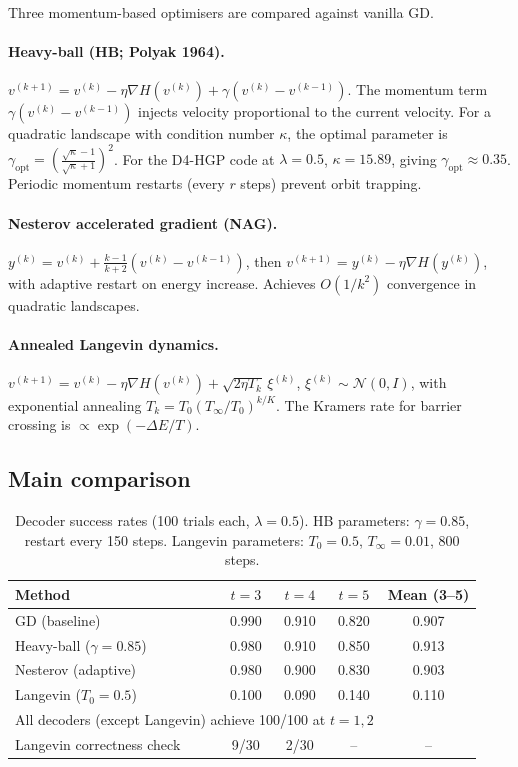 \documentclass[12pt,a4paper]{article}
\theoremstyle{plain}
\theoremstyle{definition}
\theoremstyle{remark}
\begin{document}
Three momentum-based optimisers are compared against vanilla GD.

\paragraph{Heavy-ball (HB; Polyak 1964).}
$v^{(k+1)} = v^{(k)} - \eta\nabla H(v^{(k)}) + \gamma(v^{(k)} - v^{(k-1)})$.
The momentum term $\gamma(v^{(k)}-v^{(k-1)})$ injects velocity proportional
to the current velocity.
For a quadratic landscape with condition number $\kappa$, the optimal
parameter is $\gamma_{\mathrm{opt}} = \left(\frac{\sqrt{\kappa}-1}{\sqrt{\kappa}+1}\right)^2$.
For the D4-HGP code at $\lambda=0.5$, $\kappa = 15.89$, giving
$\gamma_{\mathrm{opt}} \approx 0.35$.
Periodic momentum restarts (every $r$ steps) prevent orbit trapping.

\paragraph{Nesterov accelerated gradient (NAG).}
$y^{(k)} = v^{(k)} + \frac{k-1}{k+2}(v^{(k)}-v^{(k-1)})$, then
$v^{(k+1)} = y^{(k)} - \eta\nabla H(y^{(k)})$,
with adaptive restart on energy increase.
Achieves $O(1/k^2)$ convergence in quadratic landscapes.

\paragraph{Annealed Langevin dynamics.}
$v^{(k+1)} = v^{(k)} - \eta\nabla H(v^{(k)}) + \sqrt{2\eta T_k}\,\xi^{(k)}$,
$\xi^{(k)}\sim\mathcal{N}(0,I)$,
with exponential annealing $T_k = T_0(T_{\infty}/T_0)^{k/K}$.
The Kramers rate for barrier crossing is $\propto \exp(-\Delta E/T)$.

\subsection{Main comparison}

\begin{table}[ht]
\centering
\caption{Decoder success rates (100 trials each, $\lambda=0.5$).
  HB parameters: $\gamma=0.85$, restart every 150 steps.
  Langevin parameters: $T_0=0.5$, $T_\infty=0.01$, 800 steps.}
\label{tab:momentum}
\small
\begin{tabular}{lcccc}
\toprule
Method & $t=3$ & $t=4$ & $t=5$ & Mean (3--5) \\
\midrule
GD (baseline) & 0.990 & 0.910 & 0.820 & 0.907 \\
Heavy-ball ($\gamma=0.85$) & 0.980 & 0.910 & 0.850 & 0.913 \\
Nesterov (adaptive) & 0.980 & 0.900 & 0.830 & 0.903 \\
Langevin ($T_0=0.5$) & 0.100 & 0.090 & 0.140 & 0.110 \\
\midrule
\multicolumn{4}{l}{All decoders (except Langevin) achieve 100/100 at $t=1,2$} \\
Langevin correctness check & 9/30 & 2/30 & -- & -- \\
\bottomrule
\end{tabular}
\end{table}
\end{document}
